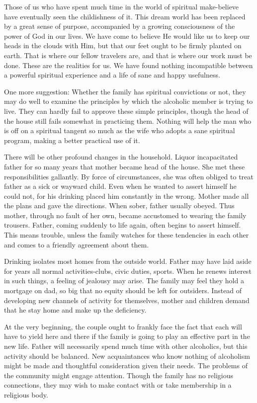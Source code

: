 \begin{biblechapter}
Those of us who have spent much time in the world of spiritual make-believe have eventually seen the childishness of it.  This dream world has been replaced by a great sense of purpose, accompanied by a growing consciousness of the power of God in our lives.  We have come to believe He would like us to keep our heads in the clouds with Him, but that our feet ought to be firmly planted on earth.  That is where our fellow travelers are, and that is where our work must be done.  These are the realities for us.  We have found nothing incompatible between a powerful spiritual experience and a life of sane and happy usefulness.

One more suggestion:  Whether the family has spiritual convictions or not, they may do well to examine the principles by which the alcoholic member is trying to live.  They can hardly fail to approve these simple principles, though the head of the house still fails somewhat in practicing them.  Nothing will help the man who is off on a spiritual tangent so much as the wife who adopts a sane spiritual program, making a better practical use of it.

There will be other profound changes in the household.  Liquor incapacitated father for so many years that mother became head of the house.  She met these responsibilities gallantly.  By force of circumstances, she was often obliged to treat father as a sick or wayward child.  Even when he wanted to assert himself he could not, for his drinking placed him constantly in the wrong.  Mother made all the plans and gave the directions.  When sober, father usually obeyed.  Thus mother, through no fault of her own, became accustomed to wearing the family trousers.  Father, coming suddenly to life again, often begins to assert himself.  This means trouble, unless the family watches for these tendencies in each other and comes to a friendly agreement about them.

Drinking isolates most homes from the outside world.  Father may have laid aside for years all normal activities-clubs, civic duties, sports.  When he renews interest in such things, a feeling of jealousy may arise.  The family may feel they hold a mortgage on dad, so big that no equity should be left for outsiders.  Instead of developing new channels of activity for themselves, mother and children demand that he stay home and make up the deficiency.

At the very beginning, the couple ought to frankly face the fact that each will have to yield here and there if the family is going to play an effective part in the new life.  Father will necessarily spend much time with other alcoholics, but this activity should be balanced.  New acquaintances who know nothing of alcoholism might be made and thoughtful consideration given their needs.  The problems of the community might engage attention.  Though the family has no religious connections, they may wish to make contact with or take membership in a religious body.


\end{biblechapter}
